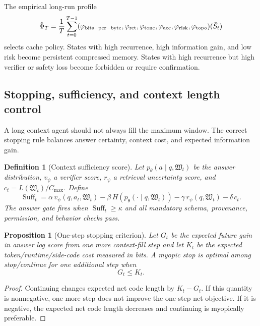 \documentclass[11pt]{article}
\newtheorem{proposition}[theorem]{Proposition}
\newtheorem{definition}[theorem]{Definition}
\numberwithin{equation}{section}
\begin{document}
The empirical long-run profile
\begin{equation}
\hat\Phi_T=\frac1T\sum_{t=0}^{T-1}(\varphi_{\rm bits-per-byte},\varphi_{\rm ret},\varphi_{\rm tone},\varphi_{\rm acc},\varphi_{\rm risk},\varphi_{\rm topo})(\bar S_t)
\end{equation}
selects cache policy. States with high recurrence, high information gain, and low risk become persistent compressed memory. States with high recurrence but high verifier or safety loss become forbidden or require confirmation.

\subsection{Stopping, sufficiency, and context length control}
A long context agent should not always fill the maximum window. The correct stopping rule balances answer certainty, context cost, and expected information gain.

\begin{definition}[Context sufficiency score]
Let $p_\theta(a\mid q,\mathfrak{W}_t)$ be the answer distribution, $v_\psi$ a verifier score, $r_\psi$ a retrieval uncertainty score, and $c_t=L(\mathfrak{W}_t)/C_{\max}$. Define
\begin{equation}
\operatorname{Suff}_t=\alpha\,v_\psi(q,a_t,\mathfrak{W}_t)-\beta\,H(p_\theta(\cdot\mid q,\mathfrak{W}_t))-\gamma\,r_\psi(q,\mathfrak{W}_t)-\delta\,c_t.
\end{equation}
The answer gate fires when $\operatorname{Suff}_t\ge\kappa$ and all mandatory schema, provenance, permission, and behavior checks pass.
\end{definition}

\begin{proposition}[One-step stopping criterion]
Let $G_t$ be the expected future gain in answer log score from one more context-fill step and let $K_t$ be the expected token/runtime/side-code cost measured in bits. A myopic stop is optimal among stop/continue for one additional step when
\begin{equation}
G_t\le K_t.
\end{equation}
\end{proposition}
\begin{proof}
Continuing changes expected net code length by $K_t-G_t$. If this quantity is nonnegative, one more step does not improve the one-step net objective. If it is negative, the expected net code length decreases and continuing is myopically preferable.
\end{proof}
\end{document}
